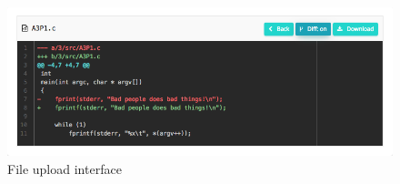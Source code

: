 \begin{figure}[H]
    \centering
        \includegraphics[width=1.0\textwidth]{figures/view-file-diff}
    \caption{File upload interface}
    \label{fig:VIEW_FILE_DIFF}
\end{figure}